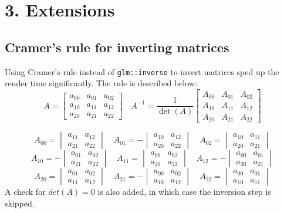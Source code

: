 \documentclass[DIV=calc, paper=a4, fontsize=11pt, twocolumn]{article}	 %
\begin{document}
	\section*{3. Extensions}
	\subsection*{Cramer's rule for inverting matrices}
	Using Cramer's rule instead of \texttt{glm::inverse} to invert matrices sped up the render time significantly. The rule is described below:
	\[
		A = 
		\begin{bmatrix} 
		a_{00} & a_{01} & a_{02} \\
		a_{10} & a_{11} & a_{12} \\
		a_{20} & a_{21} & a_{22} 
		\end{bmatrix}
		\quad
		A^{-1} = \dfrac{1}{\operatorname{det}(A)}
		\begin{bmatrix} 
		A_{00} & A_{01} & A_{02} \\
		A_{10} & A_{11} & A_{12} \\
		A_{20} & A_{21} & A_{22} 
		\end{bmatrix}
	\]

	\[	
		A_{00} =
		\begin{vmatrix} 
		a_{11} & a_{12} \\
		a_{21} & a_{22} 
		\end{vmatrix}
		\quad
		A_{01} = -
		\begin{vmatrix} 
		a_{10} & a_{12} \\
		a_{20} & a_{22} 
		\end{vmatrix}
		\quad
		A_{02} =
		\begin{vmatrix} 
		a_{10} & a_{11} \\
		a_{20} & a_{21} 
		\end{vmatrix}
		\]\[
		A_{10} = -
		\begin{vmatrix} 
		a_{01} & a_{02} \\
		a_{21} & a_{22} 
		\end{vmatrix}
		\quad
		A_{11} =
		\begin{vmatrix} 
		a_{00} & a_{02} \\
		a_{20} & a_{22} 
		\end{vmatrix}
		\quad
		A_{12} = - 
		\begin{vmatrix} 
		a_{00} & a_{01} \\
		a_{20} & a_{21} 
		\end{vmatrix}
		\]\[
		A_{20} =
		\begin{vmatrix} 
		a_{01} & a_{02} \\
		a_{11} & a_{12} 
		\end{vmatrix}
		\quad
		A_{21} = -
		\begin{vmatrix} 
		a_{00} & a_{02} \\
		a_{10} & a_{12} 
		\end{vmatrix}
		\quad
		A_{22} =
		\begin{vmatrix} 
		a_{00} & a_{01} \\
		a_{10} & a_{11} 
		\end{vmatrix}
	\]
	A check for $det(A) = 0$ is also added, in which case the inversion step is skipped.
	
\end{document}
